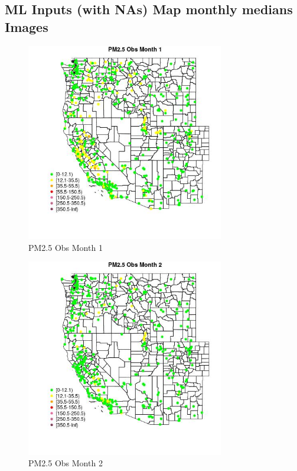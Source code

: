 
\subsection{ML Inputs (with NAs) Map monthly medians Images} 
 

\begin{figure} 
\centering  
\includegraphics[width=0.77\textwidth]{Code_Outputs/Report_ML_input_PM25_Step4_part_e_de_duplicated_aves_compiled_2019-05-18wNAs_MapObsMo1PM25_Obs.jpg} 
\caption{\label{fig:Report_ML_input_PM25_Step4_part_e_de_duplicated_aves_compiled_2019-05-18wNAsMapObsMo1PM25_Obs}PM2.5 Obs Month 1} 
\end{figure} 
 

\begin{figure} 
\centering  
\includegraphics[width=0.77\textwidth]{Code_Outputs/Report_ML_input_PM25_Step4_part_e_de_duplicated_aves_compiled_2019-05-18wNAs_MapObsMo2PM25_Obs.jpg} 
\caption{\label{fig:Report_ML_input_PM25_Step4_part_e_de_duplicated_aves_compiled_2019-05-18wNAsMapObsMo2PM25_Obs}PM2.5 Obs Month 2} 
\end{figure} 
 

